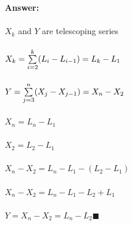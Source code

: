 \documentclass[12pt]{article}
\begin{document}
\begin{enumerate}



{\color{blue}
{\bf Answer:}\\\\
$X_k$ and $Y$ are telescoping series\\\\
$\Large X_k = \sum\limits_{i=2}^k (L_i - L_{i-1}) = L_k - L_1$\\\\
$\Large Y = \sum\limits_{j=3}^n (X_j - X_{j-1}) = X_n - X_2$\\\\
$X_n = L_n - L_1$\\\\ 
$X_2 = L_2 - L_1$\\\\
$X_n - X_2 = L_n - L_1 - (L_2 - L_1)$\\\\
$X_n - X_2 = L_n - L_1 - L_2 + L_1$\\\\
$Y = X_n - X_2 = L_n  - L_2$$\blacksquare$\\\\






}



\end{enumerate} 
\end{document}
